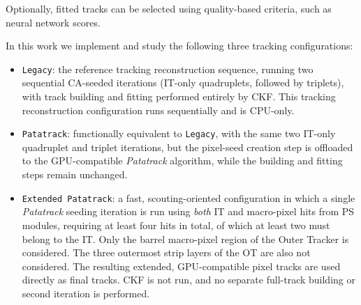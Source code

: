 \documentclass{webofc}
\begin{document}
%
\noindent Optionally, fitted tracks can be selected using quality-based criteria, such as neural network scores. \par
%
In this work we implement and study the following three tracking configurations:
%
\begin{itemize}
\item \texttt{Legacy}: the reference tracking reconstruction sequence, running two sequential CA-seeded iterations (IT-only quadruplets, followed by triplets), with track building and fitting performed entirely by CKF.
  This tracking reconstruction configuration runs sequentially and is CPU-only.
\item \texttt{Patatrack}: functionally equivalent to \texttt{Legacy}, with the same two IT-only quadruplet and triplet iterations, but the pixel-seed creation step is offloaded to the GPU-compatible \textit{Patatrack} algorithm, while the building and fitting steps remain unchanged.
\item \texttt{Extended Patatrack}: a fast, scouting-oriented configuration in which a single \textit{Patatrack} seeding iteration is run using \emph{both} IT and macro-pixel hits from PS modules, requiring at least four hits in total, of which at least two must belong to the IT.
  Only the barrel macro-pixel region of the Outer Tracker is considered.
  The three outermost strip layers of the OT are also not considered.
  The resulting extended, GPU-compatible pixel tracks are used directly as final tracks.
  CKF is not run, and no separate full-track building or second iteration is performed.
\end{itemize}
%
\end{document}
